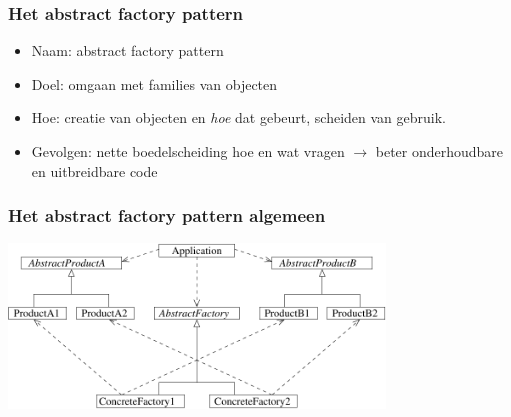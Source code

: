 \documentclass{beamer}
\begin{document}
\begin{frame}
\frametitle{Het abstract factory pattern}
\begin{itemize}
\item Naam: abstract factory pattern
\item Doel: omgaan met families van objecten
\item Hoe: creatie van objecten en \emph{hoe} dat gebeurt, scheiden van gebruik.
\item Gevolgen: nette boedelscheiding hoe en wat vragen $\rightarrow$ beter onderhoudbare en uitbreidbare code
\end{itemize}

\end{frame}


\begin{frame}
\frametitle{Het abstract factory pattern algemeen}
\begin{center}
\includegraphics[width=10cm]{factory1}
\end{center}
\end{frame}
\end{document}
